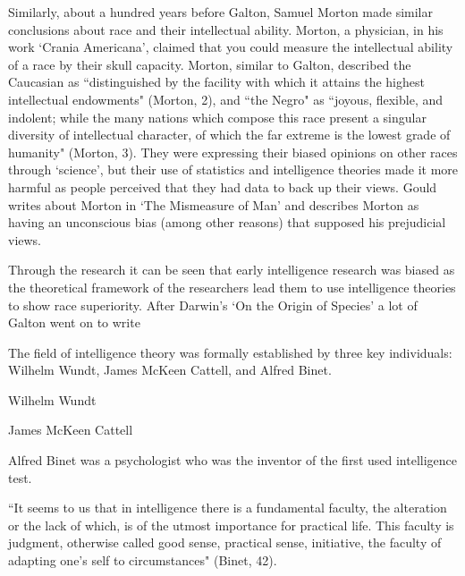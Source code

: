 \documentclass[11pt, oneside]{article}
\begin{document}
\par Similarly, about a hundred years before Galton, Samuel Morton made similar conclusions about race and their intellectual ability. Morton, a physician, in his work `Crania Americana', claimed that you could measure the intellectual ability of a race by their skull capacity. Morton, similar to Galton, described the Caucasian as ``distinguished by the facility with which it attains the highest intellectual endowments" (Morton, 2), and ``the Negro" as ``joyous, flexible, and indolent; while the many nations which compose this race present a singular diversity of intellectual character, of which the far extreme is the lowest grade of humanity" (Morton, 3). They were expressing their biased opinions on other races through `science', but their use of statistics and intelligence theories made it more harmful as people perceived that they had data to back up their views. Gould writes about Morton in `The Mismeasure of Man' and describes Morton as having an unconscious bias (among other reasons) that supposed his prejudicial views.

\par Through the research it can be seen that early intelligence research was biased as the theoretical framework of the researchers lead them to use intelligence theories to show race superiority. After Darwin's `On the Origin of Species' a lot of  Galton went on to write %

The field of intelligence theory was formally established by three key individuals: Wilhelm Wundt, James McKeen Cattell, and Alfred Binet. 

\par Wilhelm Wundt

\par James McKeen Cattell


\par Alfred Binet was a psychologist who was the inventor of the first used intelligence test. 
\par ``It seems to us that in intelligence there is a fundamental faculty, the alteration or the lack of which, is of the utmost importance for practical life. This faculty is judgment, otherwise called good sense, practical sense, initiative, the faculty of adapting one's self to circumstances" (Binet, 42).

\end{document}
